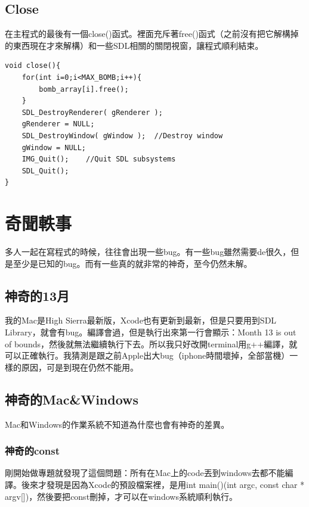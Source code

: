 \documentclass[a4paper]{article}
\theoremstyle{mystyle}	%
\begin{document}
\subsection{Close}
\label{sec:close}
\begin{minipage}[c]{0.35\textwidth}
在主程式的最後有一個{\codefont \small close()}函式。裡面充斥著{\codefont \small free()}函式（之前沒有把它解構掉的東西現在才來解構）和一些SDL相關的關閉視窗，讓程式順利結束。
\end{minipage}
\hfill
\begin{minipage}[c]{0.6\textwidth}
\begin{codefont}
\begin{lstlisting}[caption={main.cpp 576-610}]
void close(){
    for(int i=0;i<MAX_BOMB;i++){
        bomb_array[i].free();
    }
    SDL_DestroyRenderer( gRenderer );
    gRenderer = NULL;
    SDL_DestroyWindow( gWindow );  //Destroy window
    gWindow = NULL;
    IMG_Quit();    //Quit SDL subsystems
    SDL_Quit();
}

\end{lstlisting}
\end{codefont}
\end{minipage}
\section{奇聞軼事}
多人一起在寫程式的時候，往往會出現一些bug。有一些bug雖然需要de很久，但是至少是已知的bug。而有一些真的就非常的神奇，至今仍然未解。
\subsection{神奇的13月}
我的Mac是High Sierra最新版，Xcode也有更新到最新，但是只要用到SDL Library，就會有bug。編譯會過，但是執行出來第一行會顯示：Month 13 is out of bounds，然後就無法繼續執行下去。所以我只好改開terminal用g++編譯，就可以正確執行。我猜測是跟之前Apple出大bug（iphone時間壞掉，全部當機）一樣的原因，可是到現在仍然不能用。
\subsection{神奇的Mac\&Windows}
Mac和Windows的作業系統不知道為什麼也會有神奇的差異。
\subsubsection{神奇的const}
剛開始做專題就發現了這個問題：所有在Mac上的code丟到windows去都不能編譯。後來才發現是因為Xcode的預設檔案裡，是用{\codefont \small int main()(int argc, const char * argv[])}，然後要把{\codefont \small const}刪掉，才可以在windows系統順利執行。
\end{document}
